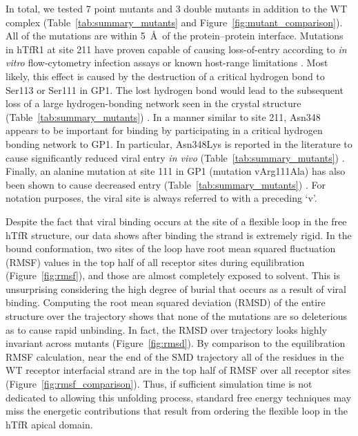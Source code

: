 \documentclass[12pt]{article}
\begin{document}
In total, we tested 7 point mutants and 3 double mutants in addition to the WT complex (Table~\ref{tab:summary_mutants} and Figure~\ref{fig:mutant_comparison}). All of the mutations are within 5~\AA\ of the protein--protein interface. Mutations in hTfR1 at site 211 have proven capable of causing loss-of-entry according to \textit{in vitro} flow-cytometry infection assays or known host-range limitations \citep{Rad2008,Rad20111,Rad20112}. Most likely, this effect is caused by the destruction of a critical hydrogen bond to Ser113 or Ser111 in GP1. The lost hydrogen bond would lead to the subsequent loss of a large hydrogen-bonding network seen in the crystal structure (Table~\ref{tab:summary_mutants}) \citep{Abraham2010}. In a manner similar to site 211, Asn348 appears to be important for binding by participating in a critical hydrogen bonding network \citep{Rad2008,Abraham2010} to GP1. In particular, Asn348Lys is reported in the literature to cause significantly reduced viral entry \textit{in vivo} (Table~\ref{tab:summary_mutants}) \citep{Rad2008,Abraham2010}. Finally, an alanine mutation at site 111 in GP1 (mutation vArg111Ala) has also been shown to cause decreased entry (Table~\ref{tab:summary_mutants}) \citep{Rad20112}. For notation purposes, the viral site is always referred to with a preceding `v'.  

Despite the fact that viral binding occurs at the site of a flexible loop in the free hTfR structure, our data shows after binding the strand is extremely rigid. In the bound conformation, two sites of the loop have root mean squared fluctuation (RMSF) values in the top half of all receptor sites during equilibration (Figure~\ref{fig:rmsf}), and those are almost completely exposed to solvent. This is unsurprising considering the high degree of burial that occurs as a result of viral binding. Computing the root mean squared deviation (RMSD) of the entire structure over the trajectory shows that none of the mutations are so deleterious as to cause rapid unbinding. In fact, the RMSD over trajectory looks highly invariant across mutants (Figure~\ref{fig:rmsd}). By comparison to the equilibration RMSF calculation, near the end of the SMD trajectory all of the residues in the WT receptor interfacial strand are in the top half of RMSF over all receptor sites (Figure~\ref{fig:rmsf_comparison}). Thus, if sufficient simulation time is not dedicated to allowing this unfolding process, standard free energy techniques may miss the energetic contributions that result from ordering the flexible loop in the hTfR apical domain.
\end{document}

